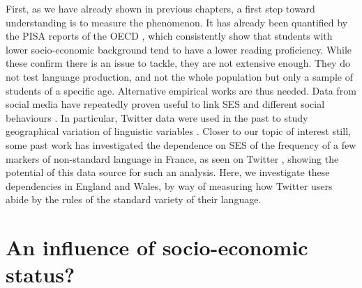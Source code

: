 \documentclass[../thesis.tex]{subfiles}
\begin{document}
First, as we have already shown in previous chapters, a first step toward understanding
is to measure the phenomenon. It has already been quantified by the PISA reports of the
OECD \cite{OECDWhereAll2019}, which consistently show that students with lower
socio-economic background tend to have a lower reading proficiency. While these confirm
there is an issue to tackle, they are not extensive enough. They do not test language
production, and not the whole population but only a sample of students of a specific
age. Alternative empirical works are thus needed. Data from social media have repeatedly
proven useful to link \ac{SES} and different social behaviours
\cite{GaoComputationalSocioeconomics2019}. In particular, Twitter data were used in the
past to study geographical variation of linguistic variables
\cite{EisensteinDiffusionLexical2014}. Closer to our topic of interest still, some past
work has investigated the dependence on \ac{SES} of the frequency of a few markers of
non-standard language in France, as seen on Twitter
\cite{AbitbolSocioeconomicDependencies2018}, showing the potential of this data source
for such an analysis. Here, we investigate these dependencies in England and Wales, by
way of measuring how Twitter users abide by the rules of the standard variety of their
language.



\section{An influence of socio-economic status?}
\end{document}
